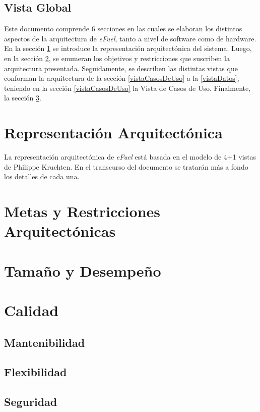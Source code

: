 \documentclass{article}
\begin{document}
    \subsection{Vista Global}
    Este documento comprende 6 secciones en las cuales se elaboran los distintos aspectos de la arquitectura de \emph{eFuel}, tanto a nivel de software como de hardware. En la sección \ref{reprArq} se introduce la representación arquitectónica del sistema. Luego, en la sección \ref{metasArq}, se enumeran los objetivos y restricciones que suscriben la arquitectura presentada. Seguidamente, se describen las distintas vistas que conforman la arquitectura de la sección \ref{vistaCasosDeUso} a la \ref{vistaDatos}, teniendo en la sección \ref{vistaCasosDeUso} la Vista de Casos de Uso. Finalmente, la sección \ref{tamDesemp}.


    \section{Representación Arquitectónica} \label{reprArq}
    La representación arquitectónica de \emph{eFuel} está basada en el modelo de 4+1 vistas de Philippe Kruchten. En el transcurso del documento se tratarán más a fondo los detalles de cada una.

    \section{Metas y Restricciones Arquitectónicas} \label{metasArq}

    
    
    
    
    

    \section{Tamaño y Desempeño} \label{tamDesemp}

    \section{Calidad}
    \subsection{Mantenibilidad}
    \subsection{Flexibilidad}
    \subsection{Seguridad}
\end{document}
